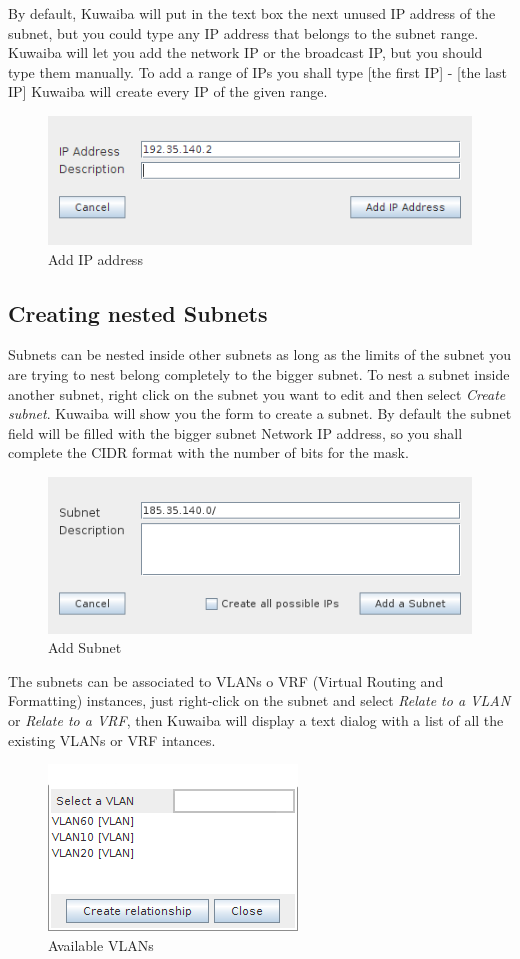 \documentclass[a4paper]{article}
\begin{document}
		By default, Kuwaiba will put in the text box the next unused IP address of the subnet, but you could type any IP address that belongs to the subnet range. Kuwaiba will let you add the network IP or the broadcast IP, but you should type them manually. To add a range of IPs you shall type [the first IP] - [the last IP] Kuwaiba will create every IP of the given range. 
		\begin{figure}[h!]
			\centering
			\includegraphics[width=0.5\linewidth]{img/ipam_add_ip_address.png}
			\caption{Add IP address}
			\label{fig:ipam_add_ip_address}
		\end{figure}
	
	   	\subsection{Creating nested Subnets}
	   	
		Subnets can be nested inside other subnets as long as the limits of the subnet you are trying to nest belong completely to the bigger subnet. To nest a subnet inside another subnet, right click on the subnet you want to edit and then select \textit{Create subnet}. Kuwaiba will show you the form to create a subnet. By default the subnet field will be filled with the bigger subnet Network IP address, so you shall complete the CIDR format with the number of bits for the mask.
		\begin{figure}[h!]
			\centering
			\includegraphics[width=0.5\linewidth]{img/ipam_add_subsubnet.png}
			\caption{Add Subnet}
			\label{fig:ipam_add_subsubnet}
		\end{figure}
		
		The subnets can be associated to VLANs o VRF (Virtual Routing and Formatting) instances, just right-click on the subnet and select \textit{Relate to a VLAN} or \textit{Relate to a VRF}, then Kuwaiba will display a text dialog with a list of all the existing VLANs or VRF intances.
		\begin{figure}[h!]
			\centering
			\includegraphics[width=0.3\linewidth]{img/ipam_available_vlans.png}
			\caption{Available VLANs}
			\label{fig:ipam_available_vlans}
		\end{figure}
		
\end{document}
